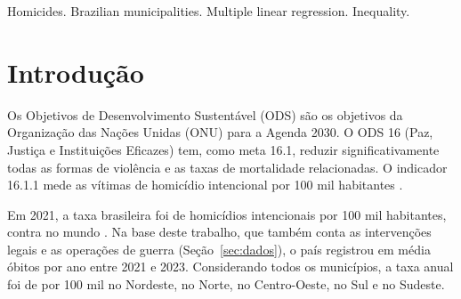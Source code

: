 \documentclass[a4paper,11pt]{article}
\begin{document}
\begin{abstract}
This study investigates municipal characteristics associated with the homicide rate in Brazil, using mortality records (2021--2023), the 2022 Census, and 2022 education indicators, covering 1,133 of the 1,134 municipalities with 30,000 inhabitants or more. A multiple linear regression model was fitted to the log of the rate, with income, the Gini index, their interaction, education, migration, and control variables. The model explains 56\% of the variation in the log of the rate. Without the interaction, inequality is associated with higher rates. With it, in an exploratory analysis, the association is positive in middle- and high-income municipalities and negative, but unstable, in the poorest ones. Higher school attendance and lower age-grade distortion are associated with lower rates. Recent migration was not significant at the 30,000 cutoff, but was significant at the 20,000 and 25,000 cutoffs. The results indicate associations, not causation.

\end{abstract}

\bigskip
\begin{keywords}
Homicides. Brazilian municipalities. Multiple linear regression. Inequality.
\end{keywords}

\newpage

\section{Introdução}

Os Objetivos de Desenvolvimento Sustentável (ODS) são os objetivos da Organização das Nações Unidas (ONU) para a Agenda 2030. O ODS 16 (Paz, Justiça e Instituições Eficazes) tem, como meta 16.1, reduzir significativamente todas as formas de violência e as taxas de mortalidade relacionadas. O indicador 16.1.1 mede as vítimas de homicídio intencional por 100 mil habitantes \citep{onu2025metadados}.

Em 2021, a taxa brasileira foi de \nTaxaBrasilContexto{} homicídios intencionais por 100 mil habitantes, contra \nTaxaMundoContexto{} no mundo \citep{unodc2023}. Na base deste trabalho, que também conta as intervenções legais e as operações de guerra (Seção~\ref{sec:dados}), o país registrou em média \nHomAno{} óbitos por ano entre 2021 e 2023. Considerando todos os municípios, a taxa anual foi de \nTaxaNEbr{} por 100 mil no Nordeste, \nTaxaNbr{} no Norte, \nTaxaCObr{} no Centro-Oeste, \nTaxaSbr{} no Sul e \nTaxaSEbr{} no Sudeste.
\end{document}
